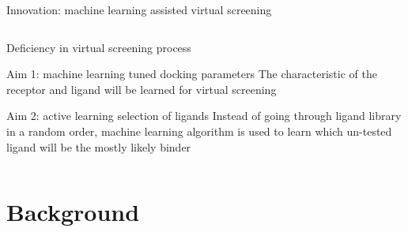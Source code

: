 \begin{frame}{Innovation: machine learning assisted virtual screening}
\begin{columns}
\begin{column}{0.55\textwidth}
\begin{block}{Deficiency in virtual screening process}
    \end{block}
    \pause
    \begin{block}{Aim 1: machine learning tuned docking parameters}
    The characteristic of the receptor and ligand will be learned for virtual screening
    \end{block}
    \begin{block}{Aim 2: active learning selection of ligands}
    Instead of going through ligand library in a random order, machine learning algorithm is used to learn which un-tested ligand will be the mostly likely binder
    \end{block}
    \end{column} 
    \end{columns}

\end{frame}


\section{Background}
